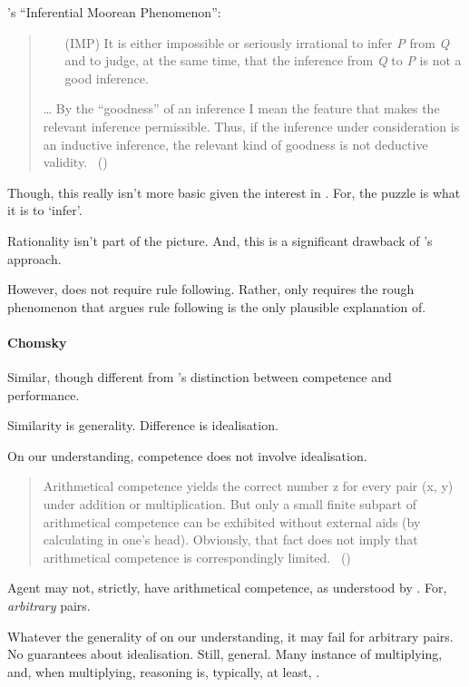 \begin{note}
  \citeauthor{Hlobil:2014tq}'s ``Inferential Moorean Phenomenon'':
  \begin{quote}
    \begin{enumerate}
    \item[(IMP)]
      It is either impossible or seriously irrational to infer \emph{P} from \emph{Q} and to judge, at the same time, that the inference from \emph{Q} to \emph{P} is not a good inference.
    \end{enumerate}
    \dots
    By the ``goodness'' of an inference I mean the feature that makes the relevant inference permissible. Thus, if the inference under consideration is an inductive inference, the relevant kind of goodness is not deductive validity.%
    \mbox{ }\hfill\mbox{(\citeyear[\S1]{Hlobil:2014tq})}
  \end{quote}

  Though, this really isn't more basic given the interest in \sR{}.
  For, the puzzle is what it is to `infer'.

  Rationality isn't part of the picture.
  And, this is a significant drawback of \citeauthor{Hlobil:2014tq}'s approach.
\end{note}


\begin{note}
  However, \sR{} does not require rule following.
  Rather, \sR{} only requires the rough phenomenon that \citeauthor{Boghossian:2008vf} argues rule following is the only plausible explanation of.
\end{note}


\paragraph{Chomsky}

\begin{note}
  Similar, though different from \citeauthor{Chomsky:2015aa}'s distinction between competence and performance.

  Similarity is generality.
  Difference is idealisation.

  On our understanding, competence does not involve idealisation.

  \begin{quote}
    Arithmetical competence yields the correct number z for every pair (x, y) under addition or multiplication.
    But only a small finite subpart of arithmetical competence can be exhibited without external aids (by calculating in one's head).
    Obviously, that fact does not imply that arithmetical competence is correspondingly limited.\newline
    \mbox{ }\hfill\mbox{(\citeyear[xii]{Chomsky:2015aa})}
  \end{quote}

  Agent may not, strictly, have arithmetical competence, as understood by \citeauthor{Chomsky:2015aa}.
  For, \emph{arbitrary} pairs.

  Whatever the generality of  on our understanding, it may fail for arbitrary pairs.
  No guarantees about idealisation.
  Still, general.
  Many instance of multiplying, and, when multiplying, reasoning is, typically, at least, \sR{}.
\end{note}

